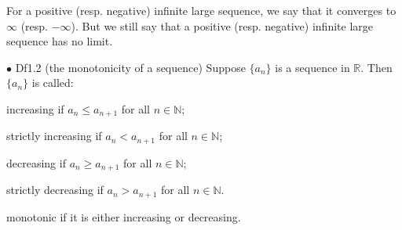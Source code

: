 \documentclass{article}
\begin{document}
\begin{Rmk}{}
    For a positive (resp. negative) infinite large sequence, we say that it converges to $\infty$ (resp. $-\infty$). But we still say that a positive (resp. negative) infinite large sequence has no limit.
\end{Rmk}

\begin{Df}{$\bullet$ Df1.2 (the monotonicity of a sequence)}
    Suppose $\{a_n\}$ is a sequence in $\mathbb{R}$. Then $\{a_n\}$ is called:
    \begin{compactenum}
        \item increasing if $a_n\leq a_{n+1}$ for all $n\in\mathbb{N}$;
        \item strictly increasing if $a_n<a_{n+1}$ for all $n\in\mathbb{N}$;
        \item decreasing if $a_n\geq a_{n+1}$ for all $n\in\mathbb{N}$;
        \item strictly decreasing if $a_n>a_{n+1}$ for all $n\in\mathbb{N}$.
        \item monotonic if it is either increasing or decreasing.
    \end{compactenum}
\end{Df}
\end{document}
